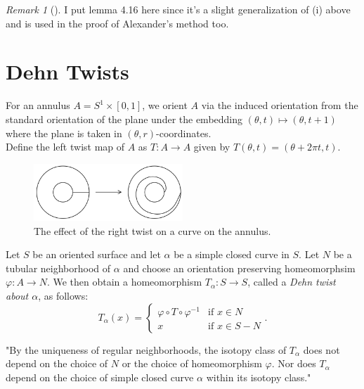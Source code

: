 \documentclass[reqno]{amsart}
\theoremstyle{definition}
\theoremstyle{remark}
\newtheorem*{remark}{Remark}
\begin{document}
\begin{remark}[]
    I put lemma 4.16 here since it's a slight generalization of
    (i) above and is used in the proof of Alexander's method
    too.
\end{remark}



\section{Dehn Twists}

For an annulus $A = S^{1} \times \left[ 0,1 \right]$, we
orient $A$ via the induced orientation from
the standard orientation of the plane under the
embedding 
$\left( \theta, t \right) \mapsto 
\left( \theta, t+1 \right) $ where
the plane is taken in $\left( \theta, r \right) $-coordinates.\\

Define the left twist map of $A$ as $T \colon A \to A$ given
by
$T\left( \theta, t \right) = \left( \theta
+ 2\pi t, t\right) $.

\begin{figure}[H]
    \centering
    \includegraphics[width=0.5\textwidth]{dehn-twist-annulus.png}
    \caption{The effect of the right twist on a curve
    on the annulus.}
    \label{fig:dehn-twist-annulus-png}
\end{figure}

Let $S$ be an oriented surface and let $\alpha$ be
a simple closed curve in $S$. Let $N$ be a tubular
neighborhood of $\alpha$ and choose
an orientation preserving homeomorphsim
$\varphi \colon A \to N$. We then obtain
a homeomorphism $T_{\alpha} \colon
S \to S$, called a \textit{Dehn twist about $\alpha$}, as
follows:
\[
T_{\alpha}(x) = 
\begin{cases}
    \varphi \circ T \circ \varphi^{-1}& \text{if } 
    x\in N \\
    x& \text{if } x\in S - N
\end{cases}.
\] 

"By the uniqueness of regular neighborhoods, the isotopy
class of $T_{\alpha}$ does not depend on the choice of
$N$ or the choice of homeomorphism $\varphi$. Nor
does $T_{\alpha}$ depend on the choice
of simple closed curve $\alpha$ within its isotopy class." 
\end{document}
